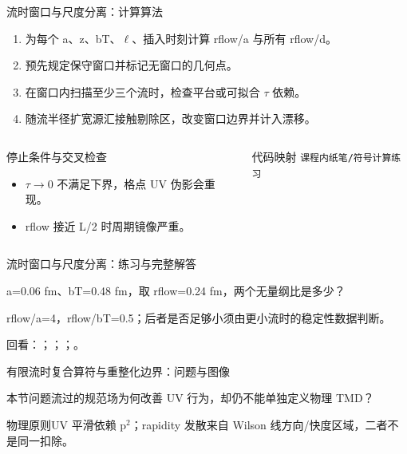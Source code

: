 \begin{frame}[t]{流时窗口与尺度分离：计算算法}
\footnotesize
{}\begin{enumerate}
\item 为每个 a、z、bT、\ensuremath{\ell}、插入时刻计算 rflow/\allowbreak{}a 与所有 rflow/\allowbreak{}d。
\item 预先规定保守窗口并标记无窗口的几何点。
\item 在窗口内扫描至少三个流时，检查平台或可拟合 \ensuremath{\tau} 依赖。
\item 随流半径扩宽源汇接触剔除区，改变窗口边界并计入漂移。
\end{enumerate}\begin{columns}[T,onlytextwidth]
\begin{block}{停止条件与交叉检查}\scriptsize\begin{itemize}
\item[\CheckMark] \ensuremath{\tau}\ensuremath{\rightarrow}0 不满足下界，格点 UV 伪影会重现。
\item[\CheckMark] rflow 接近 L/\allowbreak{}2 时周期镜像严重。
\end{itemize}\end{block}
\begin{block}{代码映射}
\scriptsize \texttt{课程内纸笔/\allowbreak{}符号计算练习}
\end{block}\end{columns}\end{frame}

\begin{frame}[t]{流时窗口与尺度分离：练习与完整解答}
\footnotesize
\begin{block}{}a=0.06 fm、bT=0.48 fm，取 rflow=0.24 fm，两个无量纲比是多少？\end{block}
\begin{exampleblock}{}rflow/\allowbreak{}a=4，rflow/\allowbreak{}bT=0.5；后者是否足够小须由更小流时的稳定性数据判断。\end{exampleblock}
\vfill
\scriptsize 回看：；；；。
\end{frame}

\begin{frame}[t]{有限流时复合算符与重整化边界：问题与图像}
\footnotesize
\begin{block}{本节问题}流过的规范场为何改善 UV 行为，却仍不能单独定义物理 TMD？\end{block}
\begin{block}{物理原则}\quad UV 平滑依赖 p\ensuremath{^{2}}；rapidity 发散来自 Wilson 线方向/\allowbreak{}快度区域，二者不是同一扣除。\end{block}
\end{frame}

